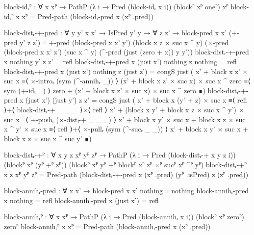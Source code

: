\begin{code}[hide]
  block-idᵣᴾ : ∀ {x} xᴾ → PathP (λ i → Pred (block-idᵣ x i)) (blockᴾ xᴾ oneᴾ) xᴾ
  block-idᵣᴾ {x} xᴾ = Pred-path (block-idᵣ-pred x (xᴾ .pred))

  block-distᵣ-+-pred :
    ∀ {y y'} x x' → IsPred y' y → ∀ z z' →
    block-pred x x' (+-pred y' z z') ≡
    +-pred
      (block-pred x x' y')
      (block x z × suc x ^ y)
      (×-pred
        (block-pred x x' z')
        (suc x ^ y)
        (^-pred (just (zero + x)) y y'))
  block-distᵣ-+-pred x nothing y' z z' = refl
  block-distᵣ-+-pred x (just x') nothing z nothing = refl
  block-distᵣ-+-pred x (just x') nothing z (just z') =
    congS just
      ( x' + block x z' × suc x                         ≡⟨ ×-introᵣ (sym (^-annihᵣ _)) ⟩
        (x' + block x z' × suc x) × suc x ^ zero        ≡⟨ sym (+-idₗ _) ⟩
        zero + (x' + block x z' × suc x) × suc x ^ zero ∎)
  block-distᵣ-+-pred x (just x') (just y') z z' =
    congS just
      ( x' + block x (y' + z) × suc x                             ≡⟨ refl ⟩+⟨ block-distᵣ-+ _ _ _ ⟩×⟨ refl ⟩
        x' + (block x y' + block x z × suc x ^ y') × suc x       ≡⟨ +-pushᵣ (×-distₗ-+ _ _ _) ⟩
        x' + block x y' × suc x + block x z × suc x ^ y' × suc x ≡⟨ refl ⟩+⟨ ×-pullᵣ (sym (^-sucᵣ _ _)) ⟩
        x' + block x y' × suc x + block x z × suc x ^ suc y'     ∎)

  block-distᵣ-+ᴾ :
    ∀ {x y z} xᴾ yᴾ zᴾ →
    PathP (λ i → Pred (block-distᵣ-+ x y z i))
      (blockᴾ xᴾ (yᴾ +ᴾ zᴾ)) (blockᴾ xᴾ yᴾ +ᴾ blockᴾ xᴾ zᴾ ×ᴾ sucᴾ xᴾ ^ᴾ yᴾ)
  block-distᵣ-+ᴾ {x} {z} xᴾ yᴾ zᴾ =
    Pred-path (block-distᵣ-+-pred x (xᴾ .pred) (yᴾ .isPred) z (zᴾ .pred))

  block-annihᵣ-pred : ∀ x x' → block-pred x x' nothing ≡ nothing
  block-annihᵣ-pred x nothing = refl
  block-annihᵣ-pred x (just x') = refl

  block-annihᵣᴾ :
    ∀ {x} xᴾ → PathP (λ i → Pred (block-annihᵣ x i)) (blockᴾ xᴾ zeroᴾ) zeroᴾ
  block-annihᵣᴾ {x} xᴾ = Pred-path (block-annihᵣ-pred x (xᴾ .pred))


\end{code}
